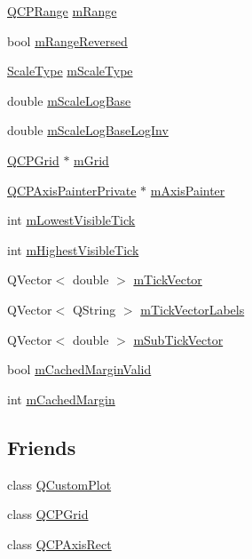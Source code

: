 \begin{DoxyCompactItemize}
\item 
\hyperlink{classQCPRange}{Q\+C\+P\+Range} \hyperlink{classQCPAxis_a1ee36773c49062d751560e11f90845f7}{m\+Range}
\item 
bool \hyperlink{classQCPAxis_a5cb034f57aa3d773a9ca55a0931dbf7b}{m\+Range\+Reversed}
\item 
\hyperlink{classQCPAxis_a36d8e8658dbaa179bf2aeb973db2d6f0}{Scale\+Type} \hyperlink{classQCPAxis_ad706039549cbbbec5fcb2baf7894e04d}{m\+Scale\+Type}
\item 
double \hyperlink{classQCPAxis_abc727ddb4af745151755d1b5e60d03c3}{m\+Scale\+Log\+Base}
\item 
double \hyperlink{classQCPAxis_a93e068984b475467929e7f6768754227}{m\+Scale\+Log\+Base\+Log\+Inv}
\item 
\hyperlink{classQCPGrid}{Q\+C\+P\+Grid} $\ast$ \hyperlink{classQCPAxis_a17bffb94aaa40311f259c6ac7bcb5d5f}{m\+Grid}
\item 
\hyperlink{classQCPAxisPainterPrivate}{Q\+C\+P\+Axis\+Painter\+Private} $\ast$ \hyperlink{classQCPAxis_aeeae00935bd2dab82d64f32544a90913}{m\+Axis\+Painter}
\item 
int \hyperlink{classQCPAxis_aebb24ba8734b7e054efc6e1ecc5414c7}{m\+Lowest\+Visible\+Tick}
\item 
int \hyperlink{classQCPAxis_abb3b3ccce7e9779fef2be91ce1a46ef0}{m\+Highest\+Visible\+Tick}
\item 
Q\+Vector$<$ double $>$ \hyperlink{classQCPAxis_aae0f9b9973b85be601200f00f5825087}{m\+Tick\+Vector}
\item 
Q\+Vector$<$ Q\+String $>$ \hyperlink{classQCPAxis_aeee4bd0fca3f587eafe33843d1cb4f82}{m\+Tick\+Vector\+Labels}
\item 
Q\+Vector$<$ double $>$ \hyperlink{classQCPAxis_a28353081e0ff35c3fe5ced923a287faa}{m\+Sub\+Tick\+Vector}
\item 
bool \hyperlink{classQCPAxis_a2cde37b6e385f47e11322df4ac1b0e9b}{m\+Cached\+Margin\+Valid}
\item 
int \hyperlink{classQCPAxis_a48ace55cbd54f7241e7f1b06fd369b64}{m\+Cached\+Margin}
\end{DoxyCompactItemize}
\subsection*{Friends}
\begin{DoxyCompactItemize}
\item 
class \hyperlink{classQCPAxis_a1cdf9df76adcfae45261690aa0ca2198}{Q\+Custom\+Plot}
\item 
class \hyperlink{classQCPAxis_a061e177f585549fc31f780852e2bd6fe}{Q\+C\+P\+Grid}
\item 
class \hyperlink{classQCPAxis_acbf20ecb140f66c5fd1bc64ae0762990}{Q\+C\+P\+Axis\+Rect}
\end{DoxyCompactItemize}


